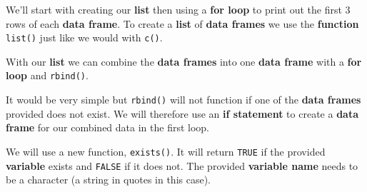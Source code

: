 \documentclass[]{book}
\newenvironment{Shaded}{\begin{snugshade}}{\end{snugshade}}
\newcommand{\KeywordTok}[1]{\textcolor[rgb]{0.13,0.29,0.53}{\textbf{#1}}}
\newcommand{\DataTypeTok}[1]{\textcolor[rgb]{0.13,0.29,0.53}{#1}}
\newcommand{\DecValTok}[1]{\textcolor[rgb]{0.00,0.00,0.81}{#1}}
\newcommand{\StringTok}[1]{\textcolor[rgb]{0.31,0.60,0.02}{#1}}
\newcommand{\CommentTok}[1]{\textcolor[rgb]{0.56,0.35,0.01}{\textit{#1}}}
\newcommand{\ControlFlowTok}[1]{\textcolor[rgb]{0.13,0.29,0.53}{\textbf{#1}}}
\newcommand{\OperatorTok}[1]{\textcolor[rgb]{0.81,0.36,0.00}{\textbf{#1}}}
\newcommand{\NormalTok}[1]{#1}
\begin{document}
We'll start with creating our \textbf{list} then using a \textbf{for
loop} to print out the first 3 rows of each \textbf{data frame}. To
create a \textbf{list} of \textbf{data frames} we use the
\textbf{function} \texttt{list()} just like we would with \texttt{c()}.

\begin{Shaded}
\end{Shaded}

With our \textbf{list} we can combine the \textbf{data frames} into one
\textbf{data frame} with a \textbf{for loop} and \texttt{rbind()}.

It would be very simple but \texttt{rbind()} will not function if one of
the \textbf{data frames} provided does not exist. We will therefore use
an \textbf{if statement} to create a \textbf{data frame} for our
combined data in the first loop.

We will use a new function, \texttt{exists()}. It will return
\texttt{TRUE} if the provided \textbf{variable} exists and
\texttt{FALSE} if it does not. The provided \textbf{variable name} needs
to be a character (a string in quotes in this case).
\end{document}
